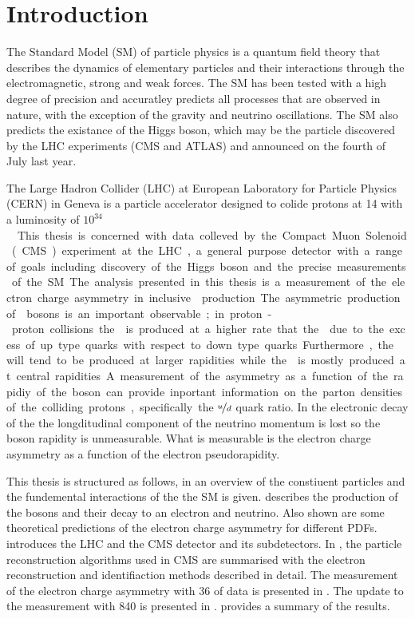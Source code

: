 \chapter{Introduction}
\label{chap:introduction}

The Standard Model (SM) of particle physics is a quantum field theory that
describes the dynamics of elementary particles and their interactions through
the electromagnetic, strong and weak forces. The {SM} has been tested with a
high degree of precision and accuratley predicts all processes that are observed
in nature, with the exception of the gravity and neutrino oscillations. The {SM}
also predicts the existance of the Higgs boson, which may be the particle
discovered by the {LHC} experiments ({CMS} and {ATLAS}) and announced on the
fourth of July last year\cite{chatrchyan2012observation,aad2012observation}.

The Large Hadron Collider (LHC) at European Laboratory for Particle Physics
(CERN) in Geneva is a particle accelerator designed to colide protons at
\unit{14}{\TeV} with a luminosity of \unit{$10^{34}$}{\lumiunits}. This thesis
is concerned with data colleved by the Compact Muon Solenoid (CMS) experiment at
the {LHC}, a general purpose detector with a range of goals including discovery
of the Higgs boson and the precise measurements of the {SM}.

The analysis presented in this thesis is a measurement of the electron charge
asymmetry in inclusive \PW production. The asymmetric production of \PW bosons
is an important observable; in proton-proton collisions the \PWp is  produced at
a higher rate that the \PWm due to the excess of up type quarks with respect to
down type quarks. Furthermore, the \PWp will tend to be produced at larger
rapidities while the \PWm is mostly produced at central rapidities. A
measurement of the asymmetry as a function of the rapidiy of the boson can
provide inportant information on the parton densities of the colliding protons,
specifically the $\nicefrac{u}{d}$ quark ratio.  In the electronic decay of the
\PW the longditudinal component of the neutrino momentum is lost so the boson
rapidity is unmeasurable. What is measurable is the electron charge asymmetry as
a function of the electron pseudorapidity. 

This thesis is structured as follows, in  an overview of the
constiuent particles  and the fundemental interactions of the the {SM} is given.
 describes the production of the \PW bosons and their
decay to an electron and neutrino. Also shown are some theoretical predictions
of the electron charge asymmetry for different PDFs.  
introduces the {LHC} and the {CMS} detector and its subdetectors.  In
, the particle reconstruction algorithms used in CMS
are summarised with the electron reconstruction and identifiaction methods
described in detail. The measurement of the electron charge asymmetry with
\unit{36}{\invpb} of data is presented in . The update
to the measurement with \unit{840}{\invpb} is presented in
.  provides a summary of
the results.




